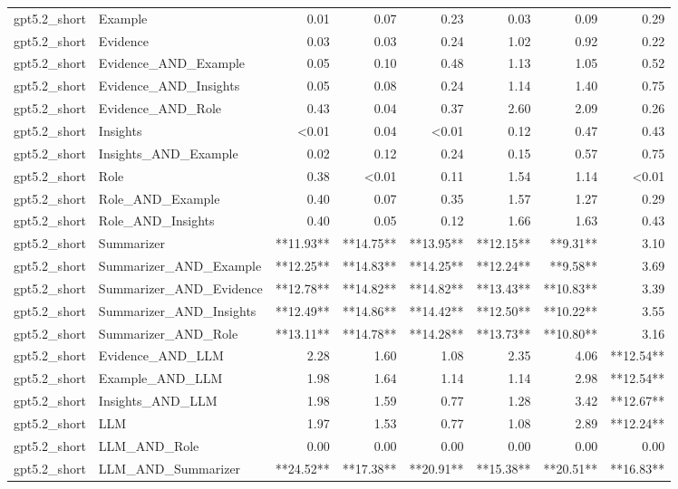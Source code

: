 \begin{tabular}{llrrrrrr}
gpt5.2_short & Example & 0.01 & 0.07 & 0.23 & 0.03 & 0.09 & 0.29 \\
gpt5.2_short & Evidence & 0.03 & 0.03 & 0.24 & 1.02 & 0.92 & 0.22 \\
gpt5.2_short & Evidence_AND_Example & 0.05 & 0.10 & 0.48 & 1.13 & 1.05 & 0.52 \\
gpt5.2_short & Evidence_AND_Insights & 0.05 & 0.08 & 0.24 & 1.14 & 1.40 & 0.75 \\
gpt5.2_short & Evidence_AND_Role & 0.43 & 0.04 & 0.37 & 2.60 & 2.09 & 0.26 \\
gpt5.2_short & Insights & <0.01 & 0.04 & <0.01 & 0.12 & 0.47 & 0.43 \\
gpt5.2_short & Insights_AND_Example & 0.02 & 0.12 & 0.24 & 0.15 & 0.57 & 0.75 \\
gpt5.2_short & Role & 0.38 & <0.01 & 0.11 & 1.54 & 1.14 & <0.01 \\
gpt5.2_short & Role_AND_Example & 0.40 & 0.07 & 0.35 & 1.57 & 1.27 & 0.29 \\
gpt5.2_short & Role_AND_Insights & 0.40 & 0.05 & 0.12 & 1.66 & 1.63 & 0.43 \\
gpt5.2_short & Summarizer & **11.93** & **14.75** & **13.95** & **12.15** & **9.31** & 3.10 \\
gpt5.2_short & Summarizer_AND_Example & **12.25** & **14.83** & **14.25** & **12.24** & **9.58** & 3.69 \\
gpt5.2_short & Summarizer_AND_Evidence & **12.78** & **14.82** & **14.82** & **13.43** & **10.83** & 3.39 \\
gpt5.2_short & Summarizer_AND_Insights & **12.49** & **14.86** & **14.42** & **12.50** & **10.22** & 3.55 \\
gpt5.2_short & Summarizer_AND_Role & **13.11** & **14.78** & **14.28** & **13.73** & **10.80** & 3.16 \\
gpt5.2_short & Evidence_AND_LLM & 2.28 & 1.60 & 1.08 & 2.35 & 4.06 & **12.54** \\
gpt5.2_short & Example_AND_LLM & 1.98 & 1.64 & 1.14 & 1.14 & 2.98 & **12.54** \\
gpt5.2_short & Insights_AND_LLM & 1.98 & 1.59 & 0.77 & 1.28 & 3.42 & **12.67** \\
gpt5.2_short & LLM & 1.97 & 1.53 & 0.77 & 1.08 & 2.89 & **12.24** \\
gpt5.2_short & LLM_AND_Role & 0.00 & 0.00 & 0.00 & 0.00 & 0.00 & 0.00 \\
gpt5.2_short & LLM_AND_Summarizer & **24.52** & **17.38** & **20.91** & **15.38** & **20.51** & **16.83** \\

\end{tabular}

